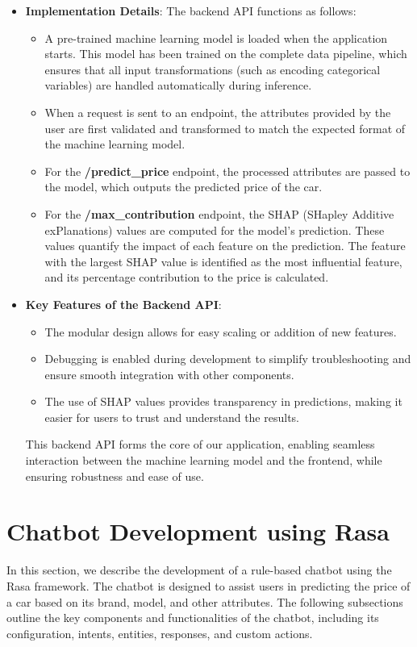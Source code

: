 \documentclass[a4paper,12pt]{article}
\begin{document}
\begin{justify}
\begin{itemize}
		\item \textbf{Implementation Details}:
		The backend API functions as follows:
		\begin{itemize}
			\item A pre-trained machine learning model is loaded when the application starts. This model has been trained on the complete data pipeline, which ensures that all input transformations (such as encoding categorical variables) are handled automatically during inference.
			\item When a request is sent to an endpoint, the attributes provided by the user are first validated and transformed to match the expected format of the machine learning model.
			\item For the \textbf{/predict\_price} endpoint, the processed attributes are passed to the model, which outputs the predicted price of the car.
			\item For the \textbf{/max\_contribution} endpoint, the SHAP (SHapley Additive exPlanations) values are computed for the model's prediction. These values quantify the impact of each feature on the prediction. The feature with the largest SHAP value is identified as the most influential feature, and its percentage contribution to the price is calculated.
		\end{itemize}
		
		\item \textbf{Key Features of the Backend API}:
		\begin{itemize}
			\item The modular design allows for easy scaling or addition of new features.
			\item Debugging is enabled during development to simplify troubleshooting and ensure smooth integration with other components.
			\item The use of SHAP values provides transparency in predictions, making it easier for users to trust and understand the results.
		\end{itemize}
		
		This backend API forms the core of our application, enabling seamless interaction between the machine learning model and the frontend, while ensuring robustness and ease of use.
	\end{itemize}
\end{justify}



\section{Chatbot Development using Rasa}
In this section, we describe the development of a rule-based chatbot using the Rasa framework. The chatbot is designed to assist users in predicting the price of a car based on its brand, model, and other attributes. The following subsections outline the key components and functionalities of the chatbot, including its configuration, intents, entities, responses, and custom actions.
\end{document}
